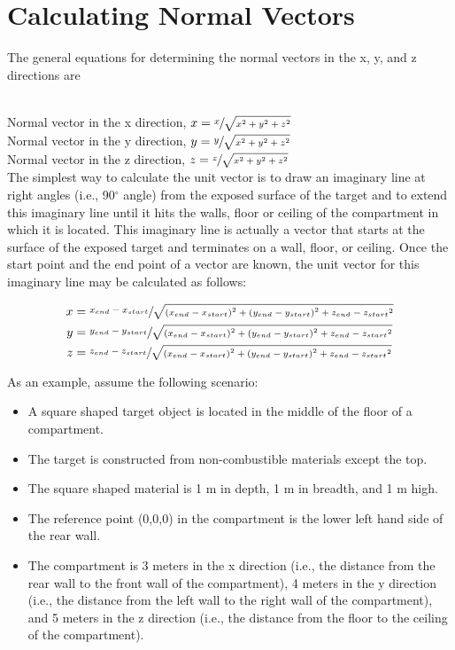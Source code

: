 \section{Calculating Normal Vectors}

The general equations for determining the normal vectors in the x, y, and z directions are \\~

Normal vector in the x direction, $x = \sfrac{x}{\sqrt{x^2 + y^2 + z^2}}$ \\

Normal vector in the y direction, $y = \sfrac{y}{\sqrt{x^2 + y^2 + z^2}}$ \\

Normal vector in the z direction, $z = \sfrac{z}{\sqrt{x^2 + y^2 + z^2}}$ \\

The simplest way to calculate the unit vector is to draw an imaginary line at right angles (i.e., 90$^\circ$ angle) from the exposed surface of the target and to extend this imaginary line until it hits the walls, floor or ceiling of the compartment in which it is located.  This imaginary line is actually a vector that starts at the surface of the exposed target and terminates on a wall, floor, or ceiling.  Once the start point and the end point of a vector are known, the unit vector for this imaginary line may be calculated as follows:

\begin{equation}
  \begin{aligned}
 x &= \sfrac{x_{end} - x_{start}}{\sqrt{{ \left( {x_{end} - x_{start}} \right) }^2 + { \left( {y_{end} - y_{start}} \right) }^2 + {z_{end} - z_{start}}^2}} \\
 y &= \sfrac{y_{end} - y_{start}}{\sqrt{{ \left( {x_{end} - x_{start}} \right) }^2 + { \left( {y_{end} - y_{start}} \right) }^2 + {z_{end} - z_{start}}^2}} \\
 z &= \sfrac{z_{end} - z_{start}}{\sqrt{{ \left( {x_{end} - x_{start}} \right) }^2 + { \left( {y_{end} - y_{start}} \right) }^2 + {z_{end} - z_{start}}^2}}
  \end{aligned}
\end{equation}

As an example, assume the following scenario:

\begin{itemize}
\item A square shaped target object is located in the middle of the floor of a compartment.
\item The target is constructed from non-combustible materials except the top.
\item The square shaped material is 1 m in depth, 1 m in breadth, and 1 m high.
\item The reference point (0,0,0) in the compartment is the lower left hand side of the rear wall.
\item The compartment is 3 meters in the x direction (i.e., the distance from the rear wall to the front wall of the compartment), 4 meters in the y direction (i.e., the distance from the left wall to the right wall of the compartment), and 5 meters in the z direction (i.e., the distance from the floor to the ceiling of the compartment).
\end{itemize}

